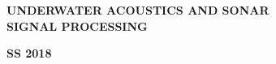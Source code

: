 \begin{center}
%
\begin{figure}[H]
{\centering {}\par}
\end{figure}
\vspace{0.2cm}
\bfseries{UNDERWATER ACOUSTICS AND SONAR\\SIGNAL PROCESSING}\\
\vspace{1.0cm}
\begin{large}
\bfseries{ SS 2018}\\
\end{large}
\vspace{0.5cm}
\begin{figure}[H]
{\centering {}\par}
\end{figure}

\end{center}
